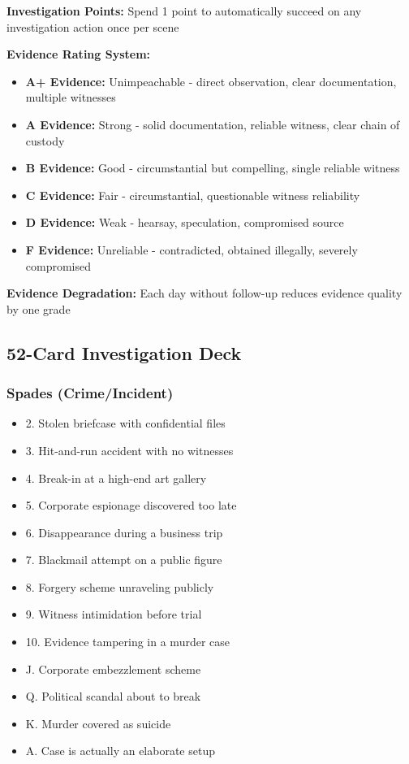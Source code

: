 \documentclass[11pt]{article}
\begin{document}
\textbf{Investigation Points:} Spend 1 point to automatically succeed on any investigation action once per scene

\textbf{Evidence Rating System:}
\begin{itemize}
    \item \textbf{A+ Evidence:} Unimpeachable - direct observation, clear documentation, multiple witnesses
    \item \textbf{A Evidence:} Strong - solid documentation, reliable witness, clear chain of custody
    \item \textbf{B Evidence:} Good - circumstantial but compelling, single reliable witness
    \item \textbf{C Evidence:} Fair - circumstantial, questionable witness reliability
    \item \textbf{D Evidence:} Weak - hearsay, speculation, compromised source
    \item \textbf{F Evidence:} Unreliable - contradicted, obtained illegally, severely compromised
\end{itemize}

\textbf{Evidence Degradation:} Each day without follow-up reduces evidence quality by one grade

\subsection{52-Card Investigation Deck}

\subsubsection{Spades (Crime/Incident)}
\begin{itemize}
    \item 2. Stolen briefcase with confidential files
    \item 3. Hit-and-run accident with no witnesses
    \item 4. Break-in at a high-end art gallery
    \item 5. Corporate espionage discovered too late
    \item 6. Disappearance during a business trip
    \item 7. Blackmail attempt on a public figure
    \item 8. Forgery scheme unraveling publicly
    \item 9. Witness intimidation before trial
    \item 10. Evidence tampering in a murder case
    \item J. Corporate embezzlement scheme
    \item Q. Political scandal about to break
    \item K. Murder covered as suicide
    \item A. Case is actually an elaborate setup
\end{itemize}
\end{document}
